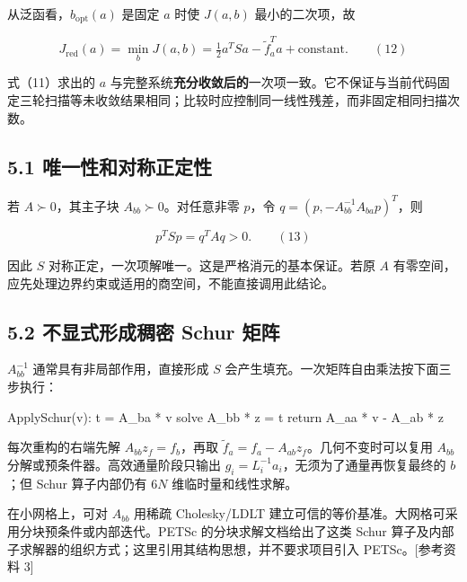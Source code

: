 \documentclass[
  11pt,
  a4paper,
]{article}
\newenvironment{Shaded}{}{}
\newcommand{\NormalTok}[1]{#1}
\begin{document}
从泛函看，\(b_{\mathrm{opt}}(a)\) 是固定 \(a\) 时使 \(J(a,b)\)
最小的二次项，故

\[
J_{\mathrm{red}}(a)=\min_b J(a,b)
=\tfrac12a^TSa-\widetilde f_a^Ta+\text{constant}. \qquad(12)
\]

式（11）求出的 \(a\)
与完整系统\textbf{充分收敛后的}一次项一致。它不保证与当前代码固定三轮扫描等未收敛结果相同；比较时应控制同一线性残差，而非固定相同扫描次数。

\hypertarget{ux552fux4e00ux6027ux548cux5bf9ux79f0ux6b63ux5b9aux6027}{%
\subsection{5.1
唯一性和对称正定性}\label{ux552fux4e00ux6027ux548cux5bf9ux79f0ux6b63ux5b9aux6027}}

若 \(A\succ0\)，其主子块 \(A_{bb}\succ0\)。对任意非零 \(p\)，令
\(q=(p,-A_{bb}^{-1}A_{ba}p)^T\)，则

\[
p^TSp=q^TAq>0. \qquad(13)
\]

因此 \(S\) 对称正定，一次项解唯一。这是严格消元的基本保证。若原 \(A\)
有零空间，应先处理边界约束或适用的商空间，不能直接调用此结论。

\hypertarget{ux4e0dux663eux5f0fux5f62ux6210ux7a20ux5bc6-schur-ux77e9ux9635}{%
\subsection{5.2 不显式形成稠密 Schur
矩阵}\label{ux4e0dux663eux5f0fux5f62ux6210ux7a20ux5bc6-schur-ux77e9ux9635}}

\(A_{bb}^{-1}\) 通常具有非局部作用，直接形成 \(S\)
会产生填充。一次矩阵自由乘法按下面三步执行：

\begin{Shaded}
\begin{Highlighting}[]
\NormalTok{ApplySchur(v):}
\NormalTok{    t = A\_ba * v}
\NormalTok{    solve A\_bb * z = t}
\NormalTok{    return A\_aa * v {-} A\_ab * z}
\end{Highlighting}
\end{Shaded}

每次重构的右端先解 \(A_{bb}z_f=f_b\)，再取
\(\widetilde f_a=f_a-A_{ab}z_f\)。几何不变时可以复用 \(A_{bb}\)
分解或预条件器。高效通量阶段只输出
\(g_i=L_i^{-1}a_i\)，无须为了通量再恢复最终的 \(b\)；但 Schur
算子内部仍有 \(6N\) 维临时量和线性求解。

在小网格上，可对 \(A_{bb}\) 用稀疏 Cholesky/LDLT
建立可信的等价基准。大网格可采用分块预条件或内部迭代。PETSc
的分块求解文档给出了这类 Schur
算子及内部子求解器的组织方式；这里引用其结构思想，并不要求项目引入
PETSc。{[}参考资料 3{]}
\end{document}
